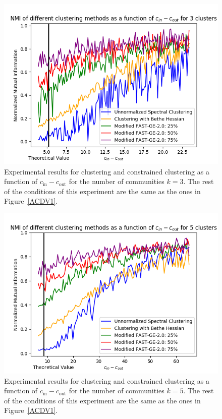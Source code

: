 \begin{figure}[]
\begin{center}
\includegraphics[width=14.5cm]{figures/ACDV2.png}
\end{center}
   \caption[Experimental results for clustering and constrained clustering as a function of $c_\text{in} - c_\text{out}$ for the number of communities $k=3$]{Experimental results for clustering and constrained clustering as a function of $c_\text{in} - c_\text{out}$ for the number of communities $k=3$. The rest of the conditions of this experiment are the same as the ones in Figure~\vref{ACDV1}.}
\label{ACDV2}
\end{figure}

\begin{figure}[]
\begin{center}
\includegraphics[width=14.5cm]{figures/ACDV3.png}
\end{center}
   \caption[Experimental results for clustering and constrained clustering as a function of $c_\text{in} - c_\text{out}$ for the number of communities $k=5$]{Experimental results for clustering and constrained clustering as a function of $c_\text{in} - c_\text{out}$ for the number of communities $k=5$. The rest of the conditions of this experiment are the same as the ones in Figure~\vref{ACDV1}.}
   \label{ACDV3}
\end{figure}

